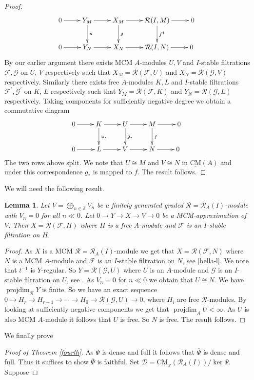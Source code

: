 \documentclass{amsart}
\newcommand{\Z}{\mathbb{Z} }
\newcommand{\eR}{\mathcal{R} }
\newcommand{\Fc}{\mathcal{F} }
\newcommand{\Dc}{\mathcal{D}}
\newcommand{\Gc}{\mathcal{G} }
\newcommand{\rt}{\rightarrow}
\newcommand{\ov}{\overline}
\newcommand{\CMS}{\operatorname{\underline{CM}}}
\newcommand{\projdim}{\operatorname{projdim}}
\theoremstyle{plain}
\newtheorem{lemma}[theorem]{Lemma}
\theoremstyle{definition}
\theoremstyle{remark}
\begin{document}
{\begin{proof}
\[
  \xymatrix
{
0
\ar@{->}[r]
 & Y_M
\ar@{->}[r]
\ar@{->}[d]^{u}
 & X_M
\ar@{->}[d]^{g}
\ar@{->}[r]
& \eR(I, M)
\ar@{->}[r]
\ar@{->}[d]^{f^\sharp}
& 0
\\
0
\ar@{->}[r]
 & Y_N
 \ar@{->}[r]
 & X_N
 \ar@{->}[r]
& \eR(I, N)
\ar@{->}[r]
&0
\
 }
\]
By our earlier argument there exists MCM $A$-modules $U, V$ and $I$-stable filtrations $\Fc, \Gc$ on $U$, $V$ respectively such that $X_M  = \eR(\Fc, U)$ and  $X_N = \eR(\Gc, V)$ respectively. Similarly there exists free $A$-modules $K, L$ and $I$-stable filtrations $\Fc^\prime, \Gc^\prime$ on $K$, $L$ respectively such that $Y_M  = \eR(\Fc, K)$ and  $Y_N = \eR(\Gc, L)$ respectively.
Taking components for sufficiently negative degree we obtain a commutative diagram
\[
  \xymatrix
{
0
\ar@{->}[r]
 & K
\ar@{->}[r]
\ar@{->}[d]^{u_*}
 & U
\ar@{->}[d]^{g_*}
\ar@{->}[r]
& M
\ar@{->}[r]
\ar@{->}[d]^{f}
& 0
\\
0
\ar@{->}[r]
 & L
 \ar@{->}[r]
 & V
 \ar@{->}[r]
& N
\ar@{->}[r]
&0
\
 }
\]
The two rows above split. We note that $U \cong M$ and $V \cong N$ in $\CMS(A)$ and under this correspondence $g_*$ is mapped to $f$.
 The result follows.
\end{proof}
We will need the following result.
\begin{lemma}\label{clinton}
Let $V = \bigoplus_{n \in \Z}V_n$ be a finitely generated graded $\eR = \eR_A(I)$-module with $V_n = 0$ for all $n \ll 0$.
Let $0 \rt Y \rt X \rt V \rt 0$ be a MCM-approximation of $V$. Then $X = \eR(\Fc, H)$ where $H$ is a free $A$-module and $\Fc$ is an $I$-stable filtration on $H$.
\end{lemma}
\begin{proof}
As $X$ is a MCM $\eR = \eR_A(I)$-module we get that $X = \eR(\Fc, N)$ where
$N$ is a MCM $A$-module and $\Fc$ is an $I$-stable filtration on $N$, see \ref{bella-l}. We note that $t^{-1}$ is $Y$-regular. So $Y =  \eR(\Gc, U)$ where
$U$ is an $A$-module and $\Gc$ is an $I$-stable filtration on $U$, see \cite[3.1]{P-Itoh-g}. As $V_n = 0$ for $n \ll 0$ we obtain that $U \cong N$. We have $\projdim_{\eR} Y$ is finite. So we have an exact sequence
$0 \rt H_r \rt H_{r-1} \rt \cdots \rt H_0 \rt \eR(\Gc, U) \rt 0$, where $H_i$ are free $\eR$-modules. By looking at sufficiently negative components we get that $\projdim_A U < \infty$. As $U$ is also MCM $A$-module it follows that $U$ is free. So $N$ is free. The result follows.
\end{proof}
We finally prove
\begin{proof}[Proof of Theorem \ref{fourth}]
As $\Psi$ is dense and full it follows that $\ov{\Psi}$ is dense and full. Thus it suffices to show $\ov{\Psi}$ is faithful. Set $\Dc =  \CMS_\Z(\eR_A(I))/\ker \Psi$. Suppose

\end{proof}}
\end{document}
